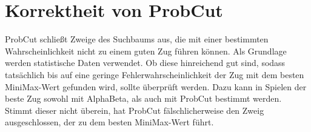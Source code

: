 
\section{Korrektheit von ProbCut}
ProbCut schließt Zweige des Suchbaums aus, die mit einer bestimmten Wahrscheinlichkeit nicht zu einem guten Zug führen
können. Als Grundlage werden statistische Daten verwendet. Ob diese hinreichend gut sind, sodass tatsächlich bis auf
eine geringe Fehlerwahrscheinlichkeit der Zug mit dem besten MiniMax-Wert gefunden wird, sollte überprüft werden. Dazu
kann in Spielen der beste Zug sowohl mit AlphaBeta, als auch mit ProbCut bestimmt werden. Stimmt dieser nicht überein,
hat ProbCut fälschlicherweise den Zweig ausgeschlossen, der zu dem besten MiniMax-Wert führt.
